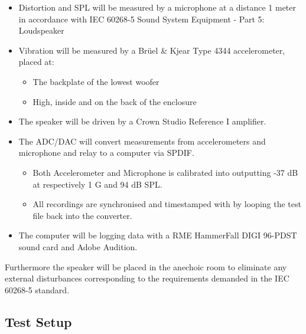 \begin{itemize}
\item Distortion and \gls{SPL} will be measured by a microphone at a distance 1 meter in accordance with IEC 60268-5 Sound System Equipment - Part 5: Loudspeaker
\item Vibration will be measured by a Brüel \& Kjear Type 4344 accelerometer, placed at:
\begin{itemize}
\item The backplate of the lowest woofer
\item High, inside and on the back of the enclosure 
\end{itemize}
\item The speaker will be driven by a Crown Studio Reference I amplifier.
\item The ADC/DAC will convert measurements from accelerometers and microphone and relay to a computer via SPDIF.
\begin{itemize}
\item Both Accelerometer and Microphone is calibrated into outputting -37 dB at respectively 1 G and 94 dB \gls{SPL}.
\item All recordings are synchronised and timestamped with by looping the test file back into the converter.
\end{itemize}
\item The computer will be logging data with a RME HammerFall DIGI 96-PDST sound card and Adobe Audition.
\end{itemize}

Furthermore the speaker will be placed in the anechoic room to eliminate any external disturbances corresponding to the requirements demanded in the 
IEC 60268-5 standard.

\subsection*{Test Setup}


